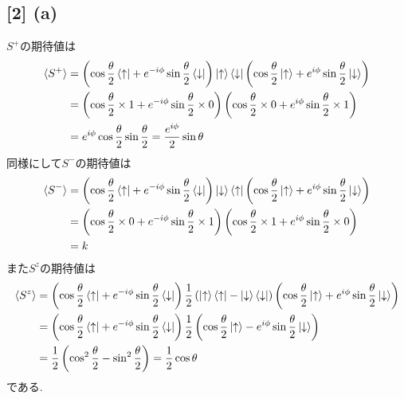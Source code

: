 \documentclass[uplatex,a4j,11pt,dvipdfmx]{jsarticle}
\newcommand{\up}{\uparrow}
\newcommand{\dn}{\downarrow}
\begin{document}
\subsection*{[2] (a)}
$S^+$の期待値は
\begin{align}
  \begin{split}
    \langle S^+\rangle&=
    \left(\cos\frac{\theta}{2}\Bra{\up}+e^{-i\phi}\sin\frac{\theta}{2}\Bra{\dn}\right)\Ket{\up}\Bra{\dn}
    \left(\cos\frac{\theta}{2}\Ket{\up}+e^{i\phi}\sin\frac{\theta}{2}\Ket{\dn}\right)\\&=
    \left(\cos\frac{\theta}{2}\times1+e^{-i\phi}\sin\frac{\theta}{2}\times0\right)
    \left(\cos\frac{\theta}{2}\times0+e^{i\phi}\sin\frac{\theta}{2}\times1\right)\\&=
    e^{i\phi}\cos\frac{\theta}{2}\sin\frac{\theta}{2}=\frac{e^{i\phi}}{2}\sin\theta
  \end{split}
\end{align}
同様にして$S^-$の期待値は
\begin{align}
  \begin{split}
    \langle S^-\rangle&=
    \left(\cos\frac{\theta}{2}\Bra{\up}+e^{-i\phi}\sin\frac{\theta}{2}\Bra{\dn}\right)\Ket{\dn}\Bra{\up}
    \left(\cos\frac{\theta}{2}\Ket{\up}+e^{i\phi}\sin\frac{\theta}{2}\Ket{\dn}\right)\\&=
    \left(\cos\frac{\theta}{2}\times0+e^{-i\phi}\sin\frac{\theta}{2}\times1\right)
    \left(\cos\frac{\theta}{2}\times1+e^{i\phi}\sin\frac{\theta}{2}\times0\right)\\&=
    k
  \end{split}
\end{align}
また$S^z$の期待値は
\begin{align}
  \begin{split}
    \langle S^z\rangle&=
    \left(\cos\frac{\theta}{2}\Bra{\up}+e^{-i\phi}\sin\frac{\theta}{2}\Bra{\dn}\right)\frac{1}{2}\left(\Ket{\up}\Bra{\up}-\Ket{\dn}\Bra{\dn}\right)
    \left(\cos\frac{\theta}{2}\Ket{\up}+e^{i\phi}\sin\frac{\theta}{2}\Ket{\dn}\right)\\&=
    \left(\cos\frac{\theta}{2}\Bra{\up}+e^{-i\phi}\sin\frac{\theta}{2}\Bra{\dn}\right)\frac{1}{2}
    \left(\cos\frac{\theta}{2}\Ket{\up}-e^{i\phi}\sin\frac{\theta}{2}\Ket{\dn}\right)\\&=
    \frac{1}{2}\left(\cos^2\frac{\theta}{2}-\sin^2\frac{\theta}{2}\right)=\frac{1}{2}\cos\theta
  \end{split}
\end{align}
である.
\end{document}
